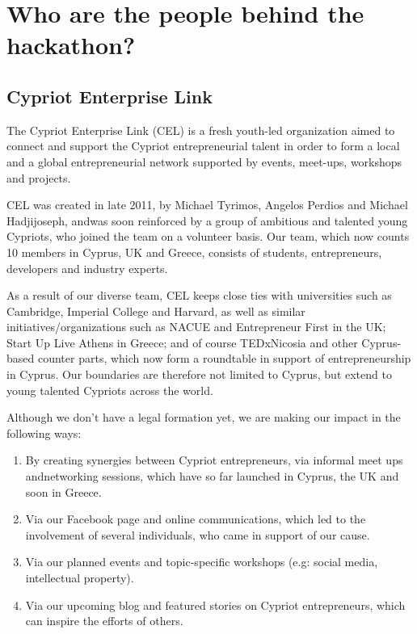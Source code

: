 \documentclass[a4paper,11pt]{report}
\begin{document}
\chapter{Who are the people behind the hackathon?}

\section{Cypriot Enterprise Link}
The Cypriot Enterprise Link (CEL) is a fresh youth-led organization aimed to connect and support the Cypriot entrepreneurial talent in order to form a local and a global entrepreneurial network supported by events, meet-ups, workshops and projects. 

CEL was created in late 2011, by Michael Tyrimos, Angelos Perdios and Michael Hadjijoseph, andwas soon reinforced by a group of ambitious and talented young Cypriots, who joined the team on a volunteer basis. Our team, which now counts 10 members in Cyprus, UK and Greece, consists of students, entrepreneurs, developers and industry experts. 

As a result of our diverse team, CEL keeps close ties with universities such as Cambridge, Imperial College and Harvard, as well as similar initiatives/organizations such as NACUE and Entrepreneur First in the UK; Start Up Live Athens in Greece; and of course TEDxNicosia and other Cyprus-based counter parts, which now form a roundtable in support of entrepreneurship in Cyprus. Our boundaries are therefore not limited to Cyprus, but extend to young talented Cypriots across the world.

Although we don’t have a legal formation yet, we are making our impact in the following ways:
\begin{enumerate}
  \item By creating synergies between Cypriot entrepreneurs, via informal meet ups andnetworking sessions, which have so far launched in Cyprus, the UK and soon in Greece. 
  \item Via our Facebook page and online communications, which led to the involvement of several individuals, who came in support of our cause.
  \item Via our planned events and topic-specific workshops (e.g: social media, intellectual property).
  \item Via our upcoming blog and featured stories on Cypriot entrepreneurs, which can inspire the efforts of others. 
\end{enumerate}
\end{document}

